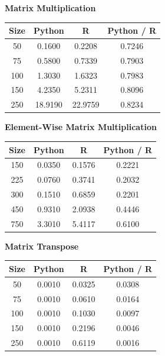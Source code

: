 \documentclass[%
  final,
  notitlepage,
  narroweqnarray,
  inline,
]{ieee}
\begin{document}
\begin{table}[h!]
  \begin{center}
    \vspace{1em}
    \textbf{Matrix Multiplication} \\
    \begin{tabular}{cccc}
      Size  & Python  &  R    & Python / R \\
      \hline
      50  & 0.1600  & 0.2208  & 0.7246 \\
      75  & 0.5800  & 0.7339  & 0.7903 \\
      100 & 1.3030  & 1.6323  & 0.7983 \\
      150 & 4.2350  & 5.2311  & 0.8096 \\
      250 & 18.9190 & 22.9759 & 0.8234 \\
    \end{tabular}

    \vspace{1em}
    \textbf{Element-Wise Matrix Multiplication} \\
    \begin{tabular}{cccc}
      Size  & Python  &  R       & Python / R \\
      \hline
      150   & 0.0350  &  0.1576  &  0.2221 \\
      225   & 0.0760  &  0.3741  &  0.2032 \\
      300   & 0.1510  &  0.6859  &  0.2201 \\
      450   & 0.9310  &  2.0938  &  0.4446 \\
      750   & 3.3010  &  5.4117  &  0.6100 \\
    \end{tabular}

    \vspace{1em}
    \textbf{Matrix Transpose} \\
    \begin{tabular}{cccc}
      Size  & Python  &  R       & Python / R \\
      \hline
      50  & 0.0010  & 0.0325 & 0.0308 \\
      75  & 0.0010  & 0.0610 & 0.0164 \\
      100 & 0.0010  & 0.1030 & 0.0097 \\
      150 & 0.0010  & 0.2196 & 0.0046 \\
      250 & 0.0010  & 0.6119 & 0.0016 \\
    \end{tabular}


\end{center}
\end{table}
\end{document}

